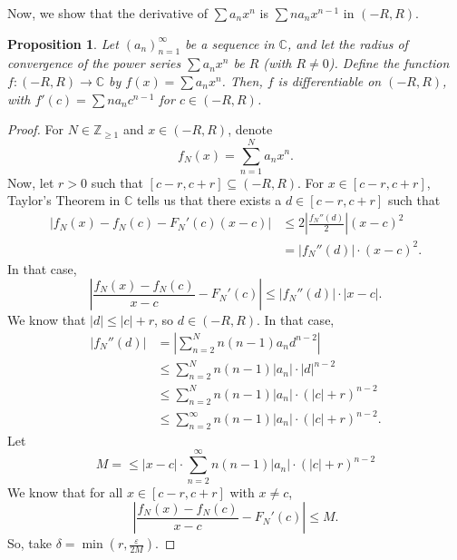 \documentclass[a4paper, openany]{memoir}
\theoremstyle{definition}
\theoremstyle{plain}
\newtheorem{proposition}[definition]{Proposition}
\begin{document}
Now, we show that the derivative of $\sum a_n x^n$ is $\sum na_n x^{n-1}$ in $(-R, R)$.
\begin{proposition}
Let $(a_n)_{n=1}^{\infty}$ be a sequence in $\mathbb{C}$, and let the radius of convergence of the power series $\sum a_n x^n$ be $R$ (with $R \neq 0$). Define the function $f: (-R, R) \to \mathbb{C}$ by $f(x) = \sum a_n x^n$. Then, $f$ is differentiable on $(-R, R)$, with $f'(c) = \sum na_n c^{n-1}$ for $c \in (-R, R)$.
\end{proposition}
\begin{proof}
For $N \in \mathbb{Z}_{\geqslant 1}$ and $x \in (-R, R)$, denote
\[f_N(x) = \sum_{n=1}^{N} a_n x^n.\]
Now, let $r > 0$ such that $[c-r, c+r] \subseteq (-R, R)$. For $x \in [c-r, c+r]$, Taylor's Theorem in $\mathbb{C}$ tells us that there exists a $d \in [c-r, c+r]$ such that
\begin{align*}
    |f_N(x) - f_N(c) - F_N'(c) (x - c)| &\leqslant 2 \left|\frac{f_N''(d)}{2}\right| (x - c)^2 \\
    &= |f_N''(d)| \cdot (x-c)^2.
\end{align*}
In that case,
\[\left|\frac{f_N(x) - f_N(c)}{x - c} - F_N'(c)\right| \leqslant |f_N''(d)| \cdot |x - c|.\]
We know that $|d| \leqslant |c| + r$, so $d \in (-R, R)$. In that case,
\begin{align*}
    |f_N''(d)| &= \left|\sum_{n=2}^{N} n(n-1) a_n d^{n-2}\right| \\
    &\leqslant \sum_{n=2}^N n(n-1) |a_n| \cdot |d|^{n-2} \\
    &\leqslant \sum_{n=2}^N n(n-1) |a_n| \cdot (|c| + r)^{n-2} \\
    &\leqslant \sum_{n=2}^\infty n(n-1) |a_n| \cdot (|c| + r)^{n-2}.
\end{align*}
Let 
\[M = \leqslant |x-c| \cdot \sum_{n=2}^\infty n(n-1) |a_n| \cdot (|c| + r)^{n-2}\]
We know that for all $x \in [c-r, c+r]$ with $x \neq c$,
\[\left|\frac{f_N(x) - f_N(c)}{x - c} - F_N'(c)\right| \leqslant M.\]
So, take $\delta = \min(r, \frac{\varepsilon}{2M})$.
\end{proof}
\end{document}
